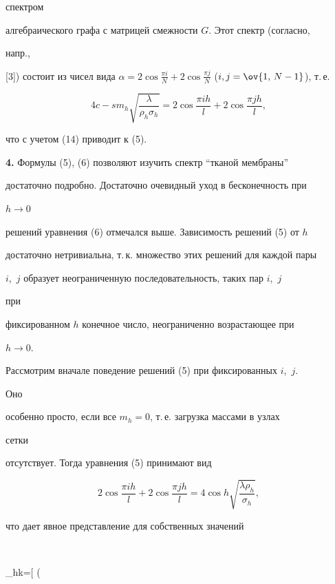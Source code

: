 спектром 


алгебраического графа с матрицей смежности $G$. Этот спектр (согласно, 


напр., 


[3]) состоит из чисел вида $\alpha=2\cos\frac{\pi i}{N}+2\cos\frac{\pi 


j}{N}$ ($i,j=\ov{1,\,N-1}$), т.\,е. 


$$ 


4c-s m_h\sqrt{\frac{\lambda}{\rho_h\sigma_h}}= 


2\cos\frac{\pi i h}{l}+2\cos\frac{\pi j h}{l}, 


$$ 


что с учетом (14) приводит к (5).


\medskip 


 


{\bf 4.} Формулы (5), (6) позволяют изучить спектр ``тканой мембраны'' 


достаточно подробно. Достаточно очевидный уход в бесконечность при 


$h\to0$ 


решений уравнения (6) отмечался выше. Зависимость решений (5) от $h$ 


достаточно нетривиальна, т.\,к. множество этих решений для каждой пары 


$i$,~$j$ образует неограниченную последовательность, таких пар $i$,~$j$ 


при 


фиксированном $h$ конечное число, неограниченно возрастающее при 


$h\to0$. 


Рассмотрим вначале поведение решений (5) при фиксированных $i$,~$j$. 


Оно 


особенно просто, если все $m_h=0$, т.\,е. загрузка массами в узлах 


сетки 


отсутствует. Тогда уравнения (5) принимают вид 


$$ 


2\cos\frac{\pi i h}{l}+2\cos\frac{\pi j h}{l}=4\cos h 


\sqrt{\frac{\lambda\rho_h}{\sigma_h}},


$$ 


что дает явное представление для собственных значений 


$$ 


\lambda_{hk}=\bigg[\pm\,\,\bigg( 


